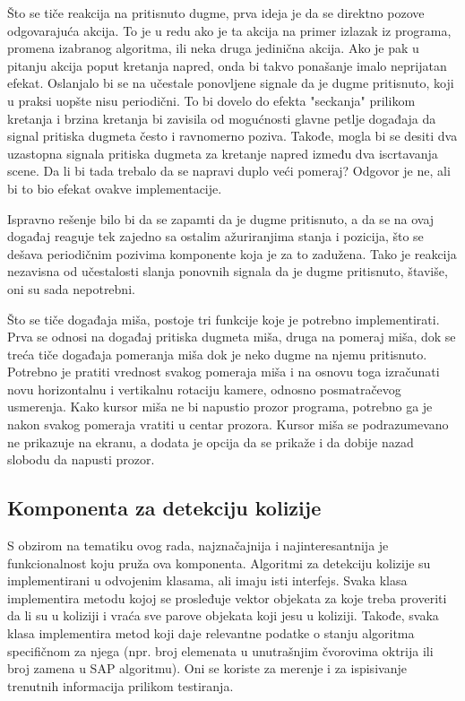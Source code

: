 \documentclass[12pt,oneside]{memoir}
\begin{document}
Što se tiče reakcija na pritisnuto dugme, prva ideja je da se direktno pozove odgovarajuća akcija. 
To je u redu ako je ta akcija na primer izlazak iz programa, promena izabranog algoritma, ili neka druga jedinična akcija.
Ako je pak u pitanju akcija poput kretanja napred, onda bi takvo ponašanje imalo neprijatan efekat. 
Oslanjalo bi se na učestale ponovljene signale da je dugme pritisnuto, koji u praksi uopšte nisu periodični.
To bi dovelo do efekta "seckanja" prilikom kretanja i brzina kretanja bi zavisila od mogućnosti glavne petlje događaja da signal pritiska dugmeta često i ravnomerno poziva.
Takođe, mogla bi se desiti  dva uzastopna signala pritiska dugmeta za kretanje napred između dva iscrtavanja scene. 
Da li bi tada trebalo da se napravi duplo veći pomeraj? Odgovor je ne, ali bi to bio efekat ovakve implementacije.

Ispravno rešenje bilo bi da se zapamti da je dugme pritisnuto,  a da se na ovaj događaj reaguje  tek zajedno sa ostalim ažuriranjima 
stanja i pozicija, što se dešava periodičnim pozivima komponente koja je za to zadužena. Tako je reakcija nezavisna od učestalosti 
slanja ponovnih signala da je dugme pritisnuto, štaviše, oni su sada nepotrebni. 

Što se tiče događaja miša, postoje tri funkcije koje je potrebno implementirati. Prva se odnosi na događaj pritiska 
dugmeta miša, druga na pomeraj miša, dok se treća tiče događaja pomeranja miša dok je neko dugme na njemu pritisnuto.
Potrebno je pratiti vrednost svakog pomeraja miša i na osnovu toga izračunati novu horizontalnu i vertikalnu rotaciju 
kamere, odnosno posmatračevog usmerenja.
Kako kursor miša ne bi napustio prozor programa, 
potrebno ga je nakon svakog pomeraja vratiti u centar prozora.
Kursor miša se podrazumevano ne prikazuje na ekranu, a dodata je opcija da se prikaže i da dobije nazad slobodu da napusti prozor.

\subsection{Komponenta za detekciju kolizije}

S obzirom na tematiku ovog rada, najznačajnija i najinteresantnija je funkcionalnost koju pruža ova komponenta.
Algoritmi za detekciju kolizije su implementirani u odvojenim klasama, ali imaju isti interfejs.
Svaka klasa implementira metodu kojoj se prosleđuje vektor objekata za koje treba proveriti da li su u koliziji
i vraća sve parove objekata koji jesu u koliziji. Takođe, svaka klasa implementira metod koji daje relevantne podatke 
o stanju algoritma specifičnom za njega (npr. broj elemenata u unutrašnjim čvorovima oktrija ili broj 
zamena u SAP algoritmu). Oni se koriste za merenje i za ispisivanje trenutnih informacija prilikom testiranja.
\end{document}
